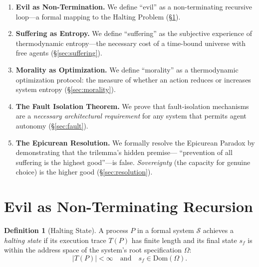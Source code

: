 \documentclass[12pt, a4paper]{article}
\theoremstyle{plain}
\theoremstyle{definition}
\newtheorem{definition}[theorem]{Definition}
\theoremstyle{remark}
\newcommand{\calS}{\mathcal{S}}
\begin{document}
\begin{enumerate}
  \item \textbf{Evil as Non-Termination.} We define ``evil'' as a
    non-terminating recursive loop---a formal mapping to the Halting
    Problem (\S\ref{sec:evil}).

  \item \textbf{Suffering as Entropy.} We define ``suffering'' as the
    subjective experience of thermodynamic entropy---the necessary cost
    of a time-bound universe with free agents (\S\ref{sec:suffering}).

  \item \textbf{Morality as Optimization.} We define ``morality'' as a
    thermodynamic optimization protocol: the measure of whether an action
    reduces or increases system entropy (\S\ref{sec:morality}).

  \item \textbf{The Fault Isolation Theorem.} We prove that fault-isolation
    mechanisms are a \emph{necessary architectural requirement} for any
    system that permits agent autonomy (\S\ref{sec:fault}).

  \item \textbf{The Epicurean Resolution.} We formally resolve the
    Epicurean Paradox by demonstrating that the trilemma's hidden premise---
    ``prevention of all suffering is the highest good''---is false.
    \emph{Sovereignty} (the capacity for genuine choice) is the higher
    good (\S\ref{sec:resolution}).
\end{enumerate}

\section{Evil as Non-Terminating Recursion}\label{sec:evil}

\begin{definition}[Halting State]\label{def:halting}
  A process $P$ in a formal system $\calS$ achieves a \emph{halting state}
  if its execution trace $T(P)$ has finite length and its final state $s_f$
  is within the address space of the system's root specification $\Omega$:
  \begin{equation}
    |T(P)| < \infty \quad \text{and} \quad s_f \in \text{Dom}(\Omega).
  \end{equation}
\end{definition}
\end{document}
